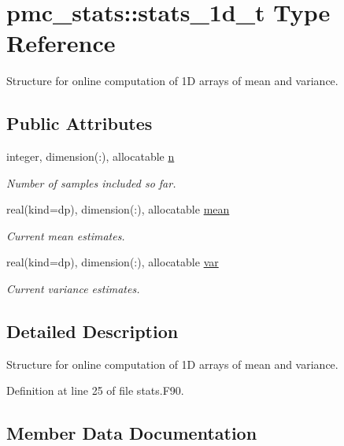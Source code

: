 \hypertarget{structpmc__stats_1_1stats__1d__t}{}\section{pmc\+\_\+stats\+:\+:stats\+\_\+1d\+\_\+t Type Reference}
\label{structpmc__stats_1_1stats__1d__t}


Structure for online computation of 1D arrays of mean and variance.  


\subsection*{Public Attributes}
\begin{DoxyCompactItemize}
\item 
integer, dimension(\+:), allocatable \mbox{\hyperlink{structpmc__stats_1_1stats__1d__t_a5c45e606f1fde9de3e1d42f470c4c9e0}{n}}
\begin{DoxyCompactList}\small\item\em Number of samples included so far. \end{DoxyCompactList}\item 
real(kind=dp), dimension(\+:), allocatable \mbox{\hyperlink{structpmc__stats_1_1stats__1d__t_a97d81088eee4a170a3c85edf18473db2}{mean}}
\begin{DoxyCompactList}\small\item\em Current mean estimates. \end{DoxyCompactList}\item 
real(kind=dp), dimension(\+:), allocatable \mbox{\hyperlink{structpmc__stats_1_1stats__1d__t_abca7647c4c98a435e74d9da0e4bba750}{var}}
\begin{DoxyCompactList}\small\item\em Current variance estimates. \end{DoxyCompactList}\end{DoxyCompactItemize}


\subsection{Detailed Description}
Structure for online computation of 1D arrays of mean and variance. 

Definition at line 25 of file stats.\+F90.



\subsection{Member Data Documentation}
\mbox{\label{structpmc__stats_1_1stats__1d__t_a97d81088eee4a170a3c85edf18473db2}} 
